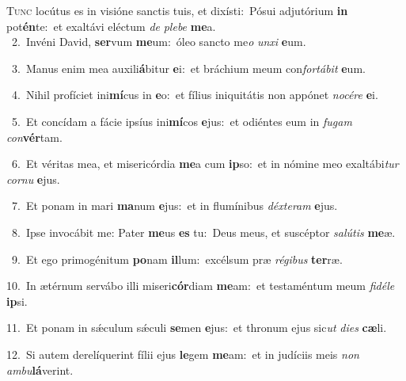 \lettrine{\initial\textcolor{\initialcolor}{T}}{unc} locútus es in visióne sanctis tuis, et dixísti:~\dagger Pósui adjutórium \textbf{in} pot\-\textbf{én}\-te:~\star et exaltávi eléctum \textit{de} \textit{ple}\-\textit{be} \textbf{me}\-a.\\
{\numbfont\textcolor{\numbcolor}{~2.}}~Invéni David, \textbf{ser}\-vum \textbf{me}\-um:~\star óleo sancto me\textit{o} \textit{un}\-\textit{xi} \textbf{e}\-um.\par
{\numbfont\textcolor{\numbcolor}{~3.}}~Manus enim mea auxili\-\textbf{á}\-bitur \textbf{e}\-i:~\star et bráchium meum con\-\textit{for}\-\textit{tá}\textit{bit} \textbf{e}\-um.\par
{\numbfont\textcolor{\numbcolor}{~4.}}~Nihil profíciet ini\-\textbf{mí}\-cus in \textbf{e}\-o:~\star et fílius iniquitátis non appónet \textit{no}\-\textit{cé}\textit{re} \textbf{e}\-i.\par
{\numbfont\textcolor{\numbcolor}{~5.}}~Et concídam a fácie ipsíus ini\-\textbf{mí}\-cos \textbf{e}\-jus:~\star et odiéntes eum in \textit{fu}\-\textit{gam} \textit{con}\-\textbf{vér}tam.\par
{\numbfont\textcolor{\numbcolor}{~6.}}~Et véritas mea, et misericórdia \textbf{me}\-a cum \textbf{ip}\-so:~\star et in nómine meo exaltábi\textit{tur} \textit{cor}\-\textit{nu} \textbf{e}\-jus.\par
{\numbfont\textcolor{\numbcolor}{~7.}}~Et ponam in mari \textbf{ma}\-num \textbf{e}\-jus:~\star et in flumínibus \textit{déx}\-\textit{te}\textit{ram} \textbf{e}\-jus.\par
{\numbfont\textcolor{\numbcolor}{~8.}}~Ipse invocábit me: Pater \textbf{me}\-us \textbf{es} tu:~\star Deus meus, et suscéptor \textit{sa}\-\textit{lú}\textit{tis} \textbf{me}\-æ.\par
{\numbfont\textcolor{\numbcolor}{~9.}}~Et ego primogénitum \textbf{po}\-nam \textbf{il}\-lum:~\star excélsum præ \textit{ré}\-\textit{gi}\textit{bus} \textbf{ter}\-ræ.\par
{\numbfont\textcolor{\numbcolor}{10.}}~In ætérnum servábo illi miseri\-\textbf{cór}\-diam \textbf{me}\-am:~\star et testaméntum meum \textit{fi}\-\textit{dé}\textit{le} \textbf{ip}\-si.\par
{\numbfont\textcolor{\numbcolor}{11.}}~Et ponam in sǽculum sǽculi \textbf{se}\-men \textbf{e}\-jus:~\star et thronum ejus sic\textit{ut} \textit{di}\-\textit{es} \textbf{cæ}\-li.\par
{\numbfont\textcolor{\numbcolor}{12.}}~Si autem derelíquerint fílii ejus \textbf{le}\-gem \textbf{me}\-am:~\star et in judíciis meis \textit{non} \textit{am}\-\textit{bu}\textbf{lá}verint.\par
